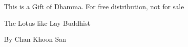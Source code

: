 This is a Gift of Dhamma.
For free distribution, not for sale






The Lotus-like
Lay Buddhist




By Chan Khoon San
